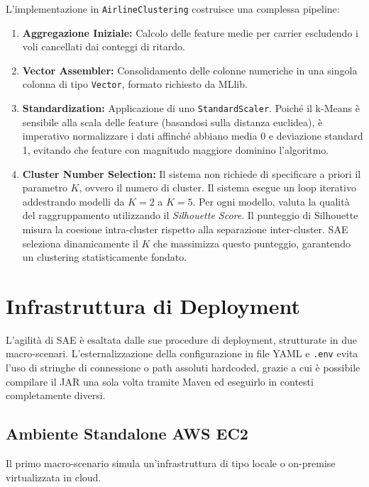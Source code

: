 \documentclass[conference]{IEEEtran}
\begin{document}
L'implementazione in \texttt{AirlineClustering} costruisce una complessa pipeline:
\begin{enumerate}
    \item \textbf{Aggregazione Iniziale:} Calcolo delle feature medie per carrier escludendo i voli cancellati dai conteggi di ritardo.
    \item \textbf{Vector Assembler:} Consolidamento delle colonne numeriche in una singola colonna di tipo \texttt{Vector}, formato richiesto da MLlib.
    \item \textbf{Standardization:} Applicazione di uno \texttt{StandardScaler}.
    Poiché il k-Means è sensibile alla scala delle feature (basandosi sulla distanza euclidea), è imperativo normalizzare i dati affinché abbiano media 0 e deviazione standard 1, evitando che feature con magnitudo maggiore dominino l'algoritmo.
    \item \textbf{Cluster Number Selection:} Il sistema non richiede di specificare a priori il parametro $K$, ovvero il numero di cluster.
    Il sistema esegue un loop iterativo addestrando modelli da $K=2$ a $K=5$.
    Per ogni modello, valuta la qualità del raggruppamento utilizzando il \textit{Silhouette Score}.
    Il punteggio di Silhouette misura la coesione intra-cluster rispetto alla separazione inter-cluster.
    SAE seleziona dinamicamente il $K$ che massimizza questo punteggio, garantendo un clustering statisticamente fondato.
\end{enumerate}


\section{Infrastruttura di Deployment}\label{sec:deployment_infrastructure}
L'agilità di SAE è esaltata dalle sue procedure di deployment, strutturate in due macro-scenari.
L'esternalizzazione della configurazione in file YAML e \texttt{.env} evita l'uso di stringhe di connessione o path assoluti hardcoded, grazie a cui è possibile compilare il JAR una sola volta tramite Maven ed eseguirlo in contesti completamente diversi.

\subsection{Ambiente Standalone AWS EC2}
Il primo macro-scenario simula un'infrastruttura di tipo locale o on-premise virtualizzata in cloud.
\end{document}
